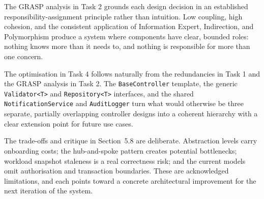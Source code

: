 \documentclass[12pt,a4paper]{article}
\newcommand{\code}[1]{\texttt{\small #1}}
\begin{document}
The GRASP analysis in Task 2 grounds each design decision in an established responsibility-assignment principle rather than intuition. Low coupling, high cohesion, and the consistent application of Information Expert, Indirection, and Polymorphism produce a system where components have clear, bounded roles: nothing knows more than it needs to, and nothing is responsible for more than one concern.

The optimisation in Task 4 follows naturally from the redundancies in Task 1 and the GRASP analysis in Task 2. The \code{BaseController} template, the generic \code{Validator<T>} and \code{Repository<T>} interfaces, and the shared \code{NotificationService} and \code{AuditLogger} turn what would otherwise be three separate, partially overlapping controller designs into a coherent hierarchy with a clear extension point for future use cases.

The trade-offs and critique in Section~5.8 are deliberate. Abstraction levels carry onboarding costs; the hub-and-spoke pattern creates potential bottlenecks; workload snapshot staleness is a real correctness risk; and the current models omit authorisation and transaction boundaries. These are acknowledged limitations, and each points toward a concrete architectural improvement for the next iteration of the system.
\end{document}
